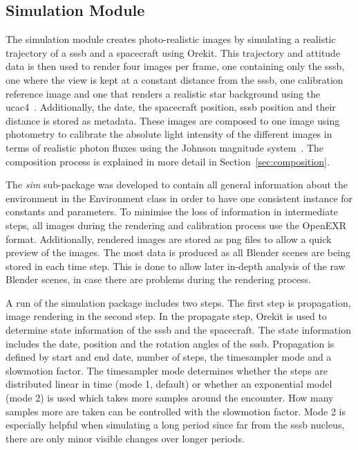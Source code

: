 \subsection{Simulation Module}
The simulation module creates photo-realistic images by simulating a realistic trajectory of a \gls{sssb} and a spacecraft using Orekit. This trajectory and attitude data is then used to render four images per frame, one containing only the \gls{sssb}, one where the view is kept at a constant distance from the \gls{sssb}, one calibration reference image and one that renders a realistic star background using the \gls{ucac4}~\cite{zacharias2013fourthUCAC4}. Additionally, the date, the spacecraft position, \gls{sssb} position and their distance is stored as metadata. These images are composed to one image using photometry to calibrate the absolute light intensity of the different images in terms of realistic photon fluxes using the Johnson magnitude system~\cite{Bessell1979UBVRIPhotometry}. The composition process is explained in more detail in Section~\ref{sec:composition}.

The \textit{sim} sub-package was developed to contain all general information about the environment in the Environment class in order to have one consistent instance for constants and parameters. To minimise the loss of information in intermediate steps, all images during the rendering and calibration process use the OpenEXR format. Additionally, rendered images are stored as \gls{png} files to allow a quick preview of the images. The most data is produced as all Blender scenes are being stored in each time step. This is done to allow later in-depth analysis of the raw Blender scenes, in case there are problems during the rendering process.

A run of the simulation package includes two steps. The first step is propagation, image rendering in the second step.
In the propagate step, Orekit is used to determine state information of the \gls{sssb} and the spacecraft. The state information includes the date, position and the rotation angles of the \gls{sssb}. Propagation is defined by start and end date, number of steps, the timesampler mode and a slowmotion factor.
The timesampler mode determines whether the steps are distributed linear in time (mode 1, default) or whether an exponential model (mode 2) is used which takes more samples around the encounter. How many samples more are taken can be controlled with the slowmotion factor. Mode 2 is especially helpful when simulating a long period since far from the \gls{sssb} nucleus, there are only minor visible changes over longer periods.

